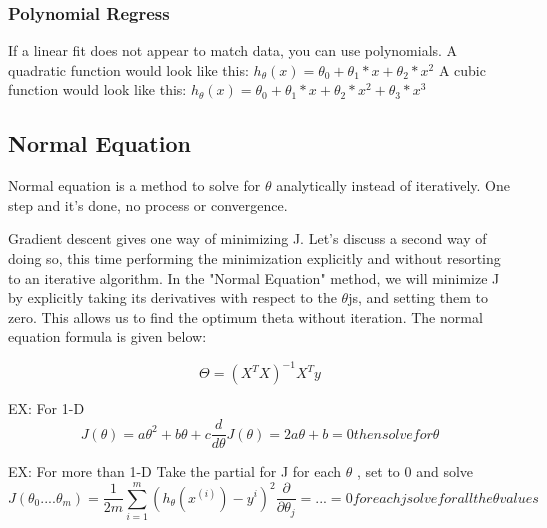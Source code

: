 \subsubsection{Polynomial Regress}

If a linear fit does not appear to match data, you can use polynomials.
A quadratic function would look like this: $h_{\theta}(x) = \theta_{0} + \theta_{1}*x + \theta_{2}*x^{2}$
A cubic function would look like this: $h_{\theta}(x) = \theta_{0} + \theta_{1}*x + \theta_{2}*x^{2} + \theta_{3}*x^{3}$

\subsection{Normal Equation}

Normal equation is a method to solve for $\theta$ analytically instead of iteratively.  One step and it's done, no process or convergence.

Gradient descent gives one way of minimizing J. Let’s discuss a second way of doing so, this time performing the minimization explicitly and without resorting to an iterative algorithm. In the "Normal Equation" method, we will minimize J by explicitly taking its derivatives with respect to the $\theta$js, and setting them to zero. This allows us to find the optimum theta without iteration. The normal equation formula is given below:

\begin{equation}
  \Theta = (X^{T}X)^{-1}X^{T}y
\end{equation}

EX: For 1-D
$$
J(\theta) = a\theta^{2} + b\theta + c
\frac{d}{d\theta} J(\theta) = 2a\theta + b = 0 then solve for \theta
$$


EX: For more than 1-D
Take the partial for J for each $\theta$ , set to 0 and solve
\begin{equation}
  J(\theta_{0}....\theta_{m}) = \frac{1}{2m}\sum_{i=1}^{m} (h_{\theta}(x^{(i)}) - y^{i})^{2}
  \frac{\partial}{\partial \theta_{j}} = ... = 0 for each j solve for all the \theta values
\end{equation}
